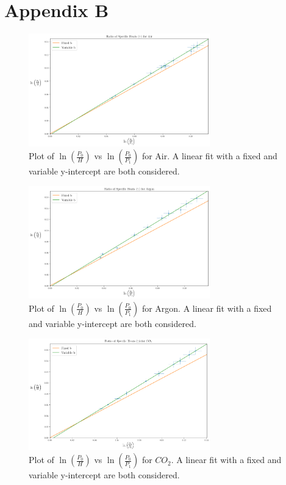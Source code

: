 \documentclass[12pt]{article}
\begin{document}
\section{Appendix B}\label{sec:AppendixB}
\begin{figure}[H]
	\includegraphics[width=0.7\textwidth]{Figures/B_Air}
		\caption{Plot of $\ln \left( \frac{{P_0}}{{H}} \right)$ vs $\ln \left( \frac{{P_0}}{{P_1}} \right)$ for Air. A linear fit with a fixed and variable y-intercept are both considered.}
\end{figure}

\begin{figure}[H]
	\includegraphics[width=0.7\textwidth]{Figures/B_Argon}
	\caption{Plot of $\ln \left( \frac{{P_0}}{{H}} \right)$ vs $\ln \left( \frac{{P_0}}{{P_1}} \right)$ for Argon. A linear fit with a fixed and variable y-intercept are both considered.}
\end{figure}

\begin{figure}[H]
	\includegraphics[width=0.7\textwidth]{Figures/B_CO2}
	\caption{Plot of $\ln \left( \frac{{P_0}}{{H}} \right)$ vs $\ln \left( \frac{{P_0}}{{P_1}} \right)$ for $CO_2$. A linear fit with a fixed and variable y-intercept are both considered.}
\end{figure}
\end{document}
